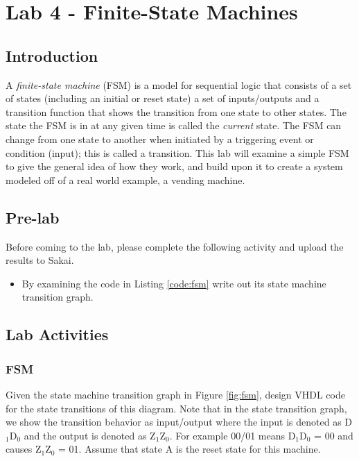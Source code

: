 \section{Lab 4 - Finite-State Machines}

\subsection{Introduction}
A \emph{finite-state machine} (FSM) is a model for sequential logic that consists of a set of states (including an initial or reset state) a set of inputs/outputs and a transition function that shows the transition from one state to other states. The state the FSM is in at any given time is called the {\it current} state. The FSM can change from one state to another when initiated by a triggering event or condition (input); this is called a transition. This lab will examine a simple FSM to give the general idea of how they work, and build upon it to create a system modeled off of a real world example, a vending machine.

\subsection{Pre-lab}

Before coming to the lab, please complete the following activity and upload the results to Sakai.
\begin{itemize}
	\item By examining the code in Listing \ref{code:fsm} write out its state machine transition graph.
\end{itemize}


\subsection{Lab Activities}

\subsubsection{FSM}

Given the state machine transition graph in Figure \ref{fig:fsm}, design VHDL code for the state transitions of this diagram. Note that in the state transition graph, we show the transition behavior as input/output where the input is denoted as D$_1$D$_0$ and the output is denoted as  Z$_1$Z$_0$. For example 00/01 means D$_1$D$_0$ = 00 and causes  Z$_1$Z$_0$ = 01. Assume that state A is the reset state for this machine.

